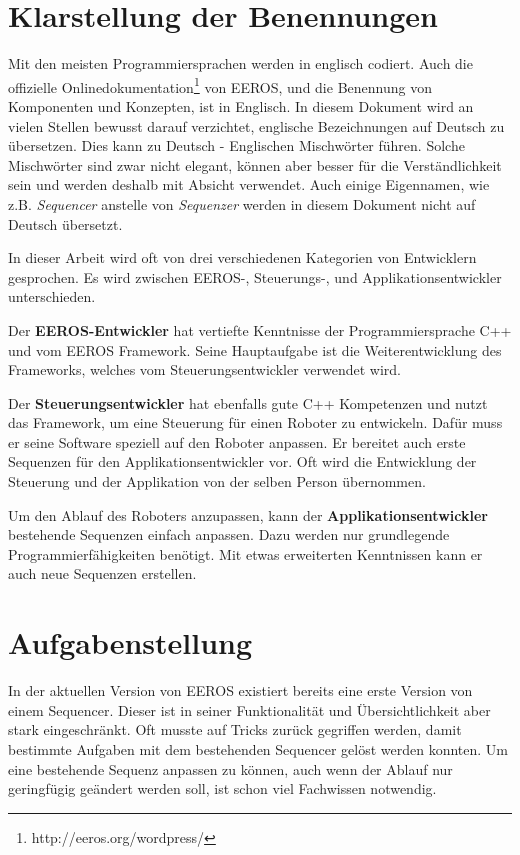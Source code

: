 \section{Klarstellung der Benennungen}
Mit den meisten Programmiersprachen werden in englisch codiert.
Auch die offizielle Onlinedokumentation\footnote{http://eeros.org/wordpress/} von EEROS, und die Benennung von Komponenten und Konzepten,  ist in Englisch.
In diesem Dokument wird an vielen Stellen bewusst darauf verzichtet, englische Bezeichnungen auf Deutsch zu übersetzen.
Dies kann zu Deutsch - Englischen Mischwörter führen.
Solche Mischwörter sind zwar nicht elegant, können aber besser für die Verständlichkeit sein und werden deshalb mit Absicht verwendet.
Auch einige Eigennamen, wie z.B. \textit{Sequencer} anstelle von \textit{Sequenzer} werden in diesem Dokument nicht auf Deutsch übersetzt.

In dieser Arbeit wird oft von drei verschiedenen Kategorien von Entwicklern gesprochen.
Es wird zwischen EEROS-, Steuerungs-, und Applikationsentwickler unterschieden.

Der \textbf{EEROS-Entwickler} hat vertiefte Kenntnisse der Programmiersprache C++ und vom EEROS Framework.
Seine Hauptaufgabe ist die Weiterentwicklung des Frameworks, welches vom Steuerungsentwickler verwendet wird.

Der \textbf{Steuerungsentwickler} hat ebenfalls gute C++ Kompetenzen und nutzt das Framework, um eine Steuerung für einen Roboter zu entwickeln.
Dafür muss er seine Software speziell auf den Roboter anpassen.
Er bereitet auch erste Sequenzen für den Applikationsentwickler vor.
Oft wird die Entwicklung der Steuerung und der Applikation von der selben Person übernommen.

Um den Ablauf des Roboters anzupassen, kann der \textbf{Applikationsentwickler} bestehende Sequenzen einfach anpassen.
Dazu werden nur grundlegende Programmierfähigkeiten benötigt.
Mit etwas erweiterten Kenntnissen kann er auch neue Sequenzen erstellen.



\section{Aufgabenstellung}
In der aktuellen Version von EEROS existiert bereits eine erste Version von einem Sequencer.
Dieser ist in seiner Funktionalität und Übersichtlichkeit aber stark eingeschränkt.
Oft musste auf Tricks zurück gegriffen werden, damit bestimmte Aufgaben mit dem bestehenden Sequencer gelöst werden konnten.
Um eine bestehende Sequenz anpassen zu können, auch wenn der Ablauf nur geringfügig geändert werden soll, ist schon viel Fachwissen notwendig.


